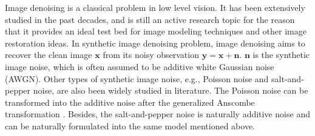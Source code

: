 Image denoising is a classical problem in low level vision. It has been extensively studied in the past decades, and is still an active research topic for the reason that it provides an ideal test bed for image modeling techniques and other image restoration ideas. In synthetic image denoising problem, image denoising aims to recover the clean image $\mathbf{x}$ from its noisy observation $\mathbf{y} = \mathbf{x} + \mathbf{n}$. $\mathbf{n}$ is the synthetic image noise, which is often assumed to be additive white Gaussian noise (AWGN). Other types of synthetic image noise, e.g., Poisson noise and salt-and-pepper noise, are also been widely studied in literature. The Poisson noise can be transformed into the additive noise after the generalized Anscombe transformation \cite{makitalo2013optimal}. Besides, the salt-and-pepper noise is naturally additive noise and can be naturally formulated into the same model mentioned above.

